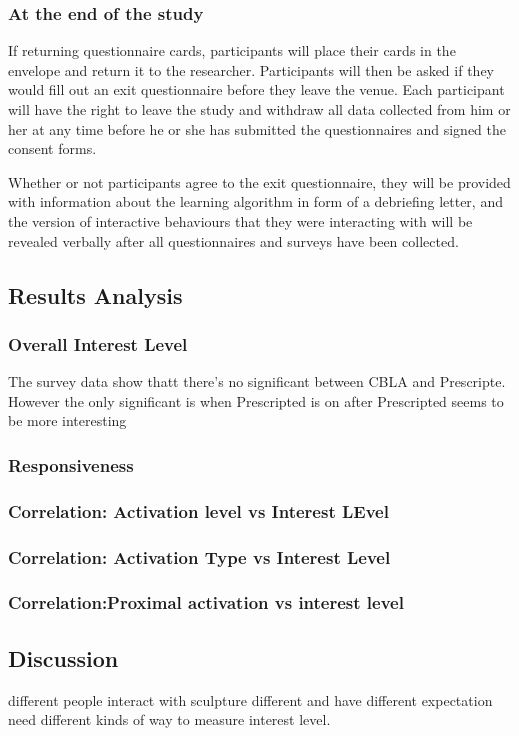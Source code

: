 \subsubsection{At the end of the study}

If returning questionnaire cards, participants will place their cards in the envelope and return it to the researcher. Participants will then be asked if they would fill out an exit questionnaire before they leave the venue. Each participant will have the right to leave the study and withdraw all data collected from him or her at any time before he or she has submitted the questionnaires and signed the consent forms. 

Whether or not participants agree to the exit questionnaire, they will be provided with
information about the learning algorithm in form of a debriefing letter, and the version of
interactive behaviours that they were interacting with will be revealed verbally after all
questionnaires and surveys have been collected.

\subsection{Results Analysis}

\subsubsection{Overall Interest Level}
The survey data show thatt there's no significant between CBLA and Prescripte.
However the only significant is when Prescripted is on after Prescripted seems to be more interesting
 
\subsubsection{Responsiveness}

\subsubsection{Correlation: Activation level vs Interest LEvel}

\subsubsection{Correlation: Activation Type vs Interest Level}
\subsubsection{Correlation:Proximal activation vs interest level}



\subsection{Discussion}

different people interact with sculpture different and have different expectation
need different kinds of way to measure interest level. 



